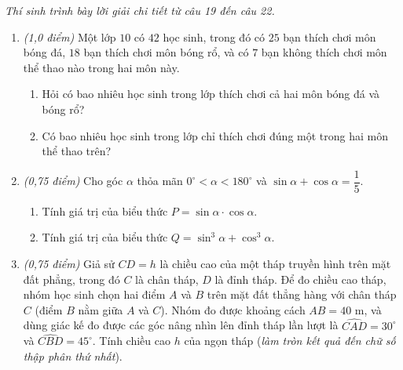 \documentclass[12pt,a4paper]{article}
\newcommand{\parttitle}[1]{\par\vspace{2pt}{\large\bfseries\color{ink}#1}\par\vspace{1pt}}
\begin{document}
\parttitle{PHẦN IV. Tự luận}
\textit{Thí sinh trình bày lời giải chi tiết từ câu 19 đến câu 22.}
\begin{enumerate}[resume]
\item \textit{(1,0 điểm)} Một lớp $10$ có $42$ học sinh, trong đó có $25$ bạn thích chơi môn bóng đá, $18$ bạn thích chơi môn bóng rổ, và có $7$ bạn không thích chơi môn thể thao nào trong hai môn này.
\begin{enumerate}
    \item Hỏi có bao nhiêu học sinh trong lớp thích chơi cả hai môn bóng đá và bóng rổ?
    \item Có bao nhiêu học sinh trong lớp chỉ thích chơi đúng một trong hai môn thể thao trên?
\end{enumerate}

\item \textit{(0,75 điểm)} Cho góc $\alpha$ thỏa mãn $0^\circ < \alpha < 180^\circ$ và $\sin \alpha + \cos \alpha = \dfrac{1}{5}$.
\begin{enumerate}
    \item Tính giá trị của biểu thức $P = \sin \alpha \cdot \cos \alpha$.
    \item Tính giá trị của biểu thức $Q = \sin^3 \alpha + \cos^3 \alpha$.
\end{enumerate}

\item \begin{minipage}[t]{0.58\linewidth}
\textit{(0,75 điểm)} Giả sử $CD = h$ là chiều cao của một tháp truyền hình trên mặt đất phẳng, trong đó $C$ là chân tháp, $D$ là đỉnh tháp. Để đo chiều cao tháp, nhóm học sinh chọn hai điểm $A$ và $B$ trên mặt đất thẳng hàng với chân tháp $C$ (điểm $B$ nằm giữa $A$ và $C$). Nhóm đo được khoảng cách $AB = 40\text{ m}$, và dùng giác kế đo được các góc nâng nhìn lên đỉnh tháp lần lượt là $\widehat{CAD} = 30^\circ$ và $\widehat{CBD} = 45^\circ$. Tính chiều cao $h$ của ngọn tháp (\textit{làm tròn kết quả đến chữ số thập phân thứ nhất}).
\end{minipage}\hfill
\begin{minipage}[t]{0.38\linewidth}
\centering
{}
\end{minipage}
\end{enumerate}
\end{document}
